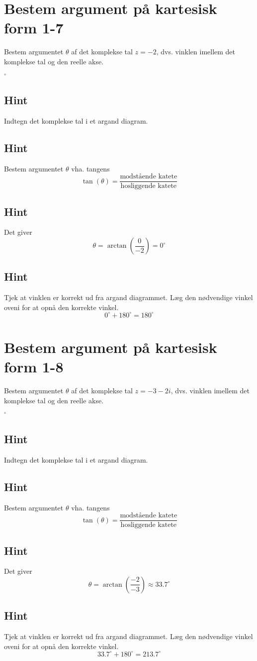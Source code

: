 \documentclass{article}
\newenvironment{exercise}[1]{\newpage\section{#1}}{}
\newcommand{\answerbox}[1]{\fbox{$#1$}}
\newcommand{\hint}{\subsection*{Hint}}
\begin{document}
\begin{exercise}{Bestem argument på kartesisk form 1-7}
	
	Bestem argumentet $\theta$ af det komplekse tal $z=-2$, dvs. vinklen imellem det komplekse tal og den reelle akse.
	
	\answerbox{180}$^\circ$
	
	
	\hint 
	
	Indtegn det komplekse tal i et argand diagram.
	
	
	\hint
	
	Bestem argumentet $\theta$ vha. tangens
	\[
	\tan(\theta)=\frac{\textrm{modstående katete}}{\textrm{hosliggende katete}}
	\]
	
	\hint 
	
	Det giver
	\[
	\theta = \arctan \left(\frac{0}{-2}\right) = 0^\circ
	\]
	
	\hint
	
	Tjek at vinklen er korrekt ud fra argand diagrammet. Læg den nødvendige vinkel oveni for at opnå den korrekte vinkel. 
	\[
	0^\circ + 180^\circ = 180^\circ
	\]
	
	
\end{exercise}

\newpage

\begin{exercise}{Bestem argument på kartesisk form 1-8}
	
	Bestem argumentet $\theta$ af det komplekse tal $z=-3-2i$, dvs. vinklen imellem det komplekse tal og den reelle akse.
	
	\answerbox{213.7}$^\circ$
	
	
	\hint 
	
	Indtegn det komplekse tal i et argand diagram.
	
	
	\hint
	
	Bestem argumentet $\theta$ vha. tangens
	\[
	\tan(\theta)=\frac{\textrm{modstående katete}}{\textrm{hosliggende katete}}
	\]
	
	\hint 
	
	Det giver
	\[
	\theta = \arctan \left(\frac{-2}{-3}\right) \approx 33.7^\circ
	\]
	
	\hint
	
	Tjek at vinklen er korrekt ud fra argand diagrammet. Læg den nødvendige vinkel oveni for at opnå den korrekte vinkel. 
	\[
	33.7^\circ + 180^\circ = 213.7^\circ
	\]
	
	
\end{exercise}
\end{document}
